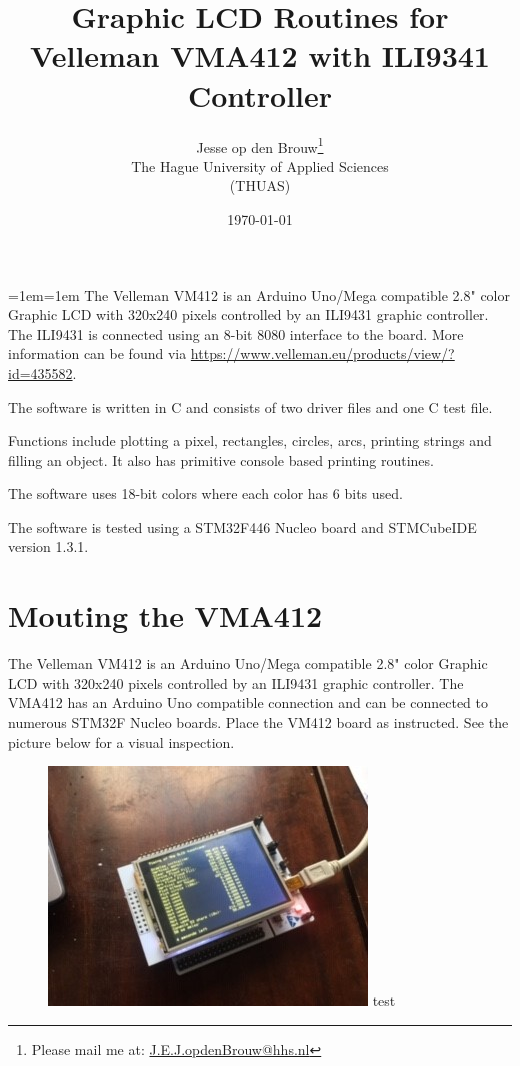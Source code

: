 \documentclass[12pt]{article}
\author{Jesse op den Brouw\thanks{Please mail me at: \href{mailto:J.E.J.opdenBrouw@hhs.nl}{J.E.J.opdenBrouw@hhs.nl}}\\The Hague University of Applied Sciences\\(THUAS)}
\title{Graphic LCD Routines for Velleman VMA412 with ILI9341 Controller}
\date{\today}
\begin{document}
\maketitle

\vfill
{\small\leftskip=1em\rightskip=1em
The Velleman VM412 is an Arduino Uno/Mega compatible 2.8" color Graphic LCD with 320x240 pixels controlled by an ILI9431 graphic controller.
The ILI9431 is connected using an 8-bit 8080 interface to the board. More information can be found via
\url{https://www.velleman.eu/products/view/?id=435582}.

The software is written in C and consists of two driver files and one C test file.

Functions include plotting a pixel, rectangles, circles, arcs, printing strings and filling an object.
It also has primitive console based printing routines.

The software uses 18-bit colors where each color has 6 bits used.

The software is tested using a STM32F446 Nucleo board and STMCubeIDE version 1.3.1.

}
\vfill

\newpage
\tableofcontents


\newpage
\section{Mouting the VMA412}
The Velleman VM412 is an Arduino Uno/Mega compatible 2.8" color Graphic LCD with 320x240 pixels controlled by an ILI9431 graphic controller.
The VMA412 has an Arduino Uno compatible connection and can be connected to numerous STM32F Nucleo boards.
Place the VM412 board as instructed. See the picture below for a visual inspection.

\begin{figure}[!ht]
\centering
\includegraphics[scale=1]{setup_small}
test
\end{figure}
\end{document}

